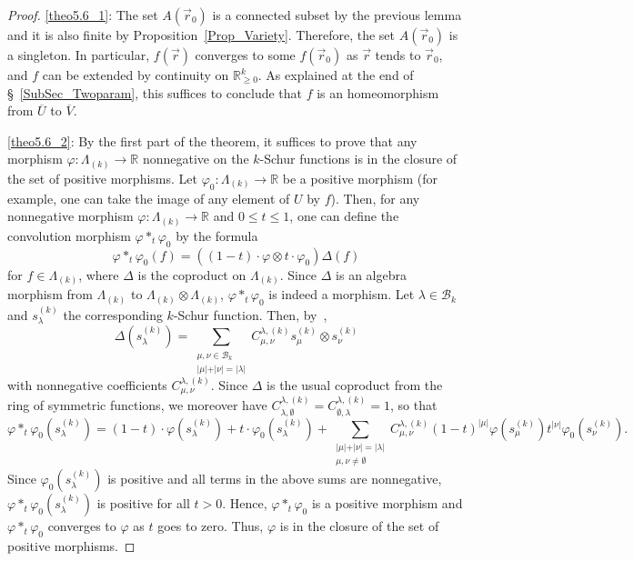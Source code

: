 \documentclass[ALCO,ThmDefs,Unicode,epreuves]{cedram}
\begin{document}
\begin{proof}
\eqref{theo5.6_1}: The set $A(\vec{r}_{0})$ is a connected subset by the previous lemma and
it is also finite by Proposition~\ref{Prop_Variety}. Therefore, the set
$A(\vec{r}_{0})$ is a singleton. In particular, $f(\vec{r})$ converges to some
$f(\vec{r}_{0})$ as $\vec{r}$ tends to $\vec{r}_{0}$, and $f$ can be extended
by continuity on $\mathbb{R}_{\geq0}^{k}$. As explained at the end of
\S~\ref{SubSec_Twoparam}, this suffices to conclude that $f$ is an
homeomorphism from $\overline{U}$ to $\overline{V}$.

\eqref{theo5.6_2}: By the first part of the theorem, it suffices to prove that any morphism
$\varphi:\Lambda_{(k)}\rightarrow\mathbb{R}$ nonnegative on the $k$-Schur
functions is in the closure of the set of positive morphisms. Let $\varphi
_{0}:\Lambda_{(k)}\rightarrow\mathbb{R}$ be a positive morphism (for example,
one can take the image of any element of $U$ by $f$). Then, for any
nonnegative morphism $\varphi:\Lambda_{(k)}\rightarrow\mathbb{R}$ and $0\leq
t\leq1$, one can define the convolution morphism $\varphi*_{t}\varphi_{0}$ by
the formula
\[
\varphi*_{t}\varphi_{0}(f)=((1-t)\cdot\varphi\otimes t\cdot\varphi_{0}%
)\Delta(f)
\]
for $f\in\Lambda_{(k)}$, where $\Delta$ is the coproduct on $\Lambda_{(k)}$.
Since $\Delta$ is an algebra morphism from $\Lambda_{(k)}$ to $\Lambda
_{(k)}\otimes\Lambda_{(k)}$, $\varphi*_{t}\varphi_{0}$ is indeed a morphism.
Let $\lambda\in\mathcal{B}_{k}$ and $s_{\lambda}^{(k)}$ the corresponding
$k$-Schur function. Then, by~\cite[Corollary~8.1]{LamLR},
\[
\Delta(s_{\lambda}^{(k)})=\sum_{\substack{\mu,\nu\in\mathcal{B}_{k}\\\vert
\mu\vert+\vert\nu\vert=\vert\lambda\vert}}C_{\mu,\nu}^{\lambda,(k)}s_{\mu
}^{(k)}\otimes s_{\nu}^{(k)}%
\]
with nonnegative coefficients $C_{\mu,\nu}^{\lambda,(k)}$. Since $\Delta$ is
the usual coproduct from the ring of symmetric functions, we moreover have
$C_{\lambda,\emptyset}^{\lambda,(k)}=C_{\emptyset,\lambda}^{\lambda,(k)}=1$,
so that
\[
\varphi*_{t}\varphi_{0}(s_{\lambda}^{(k)})=(1-t)\cdot\varphi(s_{\lambda}%
^{(k)})+t\cdot\varphi_{0}(s_{\lambda}^{(k)})+\sum_{\substack{\vert\mu
\vert+\vert\nu\vert=\vert\lambda\vert\\\mu,\nu\not =\emptyset}}C_{\mu,\nu
}^{\lambda,(k)}(1-t)^{\vert\mu\vert}\varphi(s_{\mu}^{(k)})t^{\vert\nu\vert}
\varphi_{0}(s_{\nu}^{(k)}).
\]
Since $\varphi_{0}(s_{\lambda}^{(k)})$ is positive and all terms in the above
sums are nonnegative, $\varphi*_{t}\varphi_{0}(s_{\lambda}^{(k)})$ is positive
for all $t>0$. Hence, $\varphi*_{t}\varphi_{0}$ is a positive morphism and
$\varphi*_{t}\varphi_{0}$ converges to $\varphi$ as $t$ goes to zero. Thus,
$\varphi$ is in the closure of the set of positive morphisms.
\end{proof}
\end{document}
